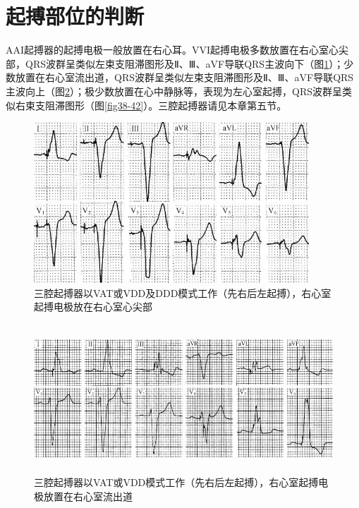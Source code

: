 \section{起搏部位的判断}

AAI起搏器的起搏电极一般放置在右心耳。VVI起搏电极多数放置在右心室心尖部，QRS波群呈类似左束支阻滞图形及Ⅱ、Ⅲ、aVF导联QRS主波向下（图\ref{fig38-40}）；少数放置在右心室流出道，QRS波群呈类似左束支阻滞图形及Ⅱ、Ⅲ、aVF导联QRS主波向上（图\ref{fig38-41}）；极少数放置在心中静脉等，表现为左心室起搏，QRS波群呈类似右束支阻滞图形（图\ref{fig38-42}）。三腔起搏器请见本章第五节。

\begin{figure}[!htbp]
 \centering
 \includegraphics[width=4.0625in,height=2.375in]{./images/Image00643.jpg}
 \captionsetup{justification=centering}
 \caption{三腔起搏器以VAT或VDD及DDD模式工作（先右后左起搏），右心室起搏电极放在右心室心尖部}
 \label{fig38-40}
  \end{figure} 

\begin{figure}[!htbp]
 \centering
 \includegraphics[width=5.58333in,height=2.19792in]{./images/Image00644.jpg}
 \captionsetup{justification=centering}
 \caption{三腔起搏器以VAT或VDD模式工作（先右后左起搏），右心室起搏电极放置在右心室流出道}
 \label{fig38-41}
  \end{figure} 

